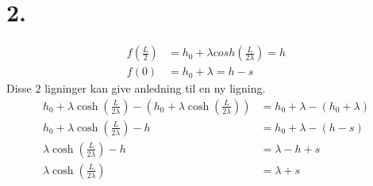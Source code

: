 \section*{2.}
%
\begin{align}
f(\frac{L}{2})	&= h_0 + \lambda cosh (\frac{L}{2 \lambda}) = h\\
f(0)			&= h_0 + \lambda = h-s
\end{align}
%
Disse $2$ ligninger kan give anledning til en ny ligning.
%
\begin{align}
h_0 + \lambda \cosh (\frac{L}{2 \lambda}) -(h_0 + \lambda \cosh (\frac{L}{2 \lambda})) &= h_0 + \lambda -(h_0 + \lambda)\\
h_0 + \lambda \cosh (\frac{L}{2 \lambda}) - h &= h_0 + \lambda - (h - s)\\
\lambda \cosh (\frac{L}{2 \lambda}) - h &= \lambda - h + s\\
\lambda \cosh (\frac{L}{2 \lambda}) &= \lambda + s
\end{align}